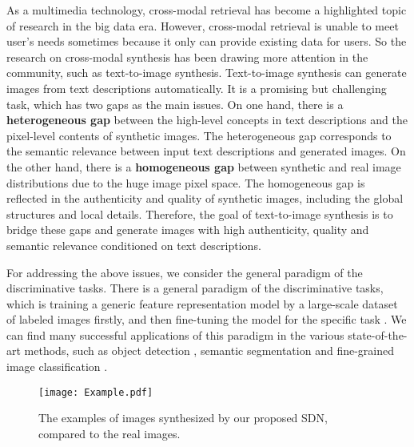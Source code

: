 \documentclass[sigconf]{acmart}
\begin{document}
As a multimedia technology, cross-modal retrieval \cite{LiMM03CFA, RasiwasiaMM10SemanticCCA, zhang2014start, feng12014cross, wang2017adversarial} has become a highlighted topic of research in the big data era. However, cross-modal retrieval is unable to meet user's needs sometimes because it only can provide existing data for users. So the research on cross-modal synthesis has been drawing more attention in the community, such as text-to-image synthesis. Text-to-image synthesis can generate images from text descriptions automatically. It is a promising but challenging task, which has two gaps as the main issues. On one hand, there is a \textbf{heterogeneous gap} between the high-level concepts in text descriptions and the pixel-level contents of synthetic images. The heterogeneous gap corresponds to the semantic relevance between input text descriptions and generated images. On the other hand, there is a \textbf{homogeneous gap} between synthetic and real image distributions due to the huge image pixel space. The homogeneous gap is reflected in the authenticity and quality of synthetic images, including the global structures and local details. Therefore, the goal of text-to-image synthesis is to bridge these gaps and generate images with high authenticity, quality and semantic relevance conditioned on text descriptions.


For addressing the above issues, we consider the general paradigm of the discriminative tasks. There is a general paradigm of the discriminative tasks, which is training a generic feature representation model by a large-scale dataset of labeled images firstly, and then fine-tuning the model for the specific task \cite{yosinski2014transferable}. We can find many successful applications of this paradigm in the various state-of-the-art methods, such as object detection \cite{girshick2016region}, semantic segmentation \cite{long2015fully} and fine-grained image classification \cite{he2017fine}.

\begin{figure}[t]
	\begin{center}
		\texttt{[image: Example.pdf]}
	\end{center}
	\caption{The examples of images synthesized by our proposed SDN, compared to the real images.}
	\label{fig:example}
\end{figure}
\end{document}
